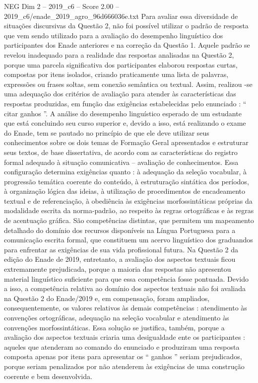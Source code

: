 \begin{textsample}{NEG Dim 2 – 2019\_c6 – Score 2.00 – 2019\_c6/enade\_2019\_agro\_96d666036e.txt}
Para avaliar essa diversidade de situações discursivas da Questão 2, não foi possível utilizar o padrão de resposta que vem sendo utilizado para a avaliação do desempenho linguístico dos participantes dos Enade anteriores e na correção da Questão 1.
Aquele padrão se revelou inadequado para a realidade das respostas analisadas na Questão 2, porque uma parcela significativa dos participantes elaborou respostas curtas, compostas por itens isolados, criando praticamente uma lista de palavras, expressões ou frases soltas, sem conexão semântica ou textual.
Assim, realizou -se uma adequação dos critérios de avaliação para atender às características das respostas produzidas, em função das exigências estabelecidas pelo enunciado : “ citar ganhos ”.
A análise do desempenho linguístico esperado de um estudante que está concluindo seu curso superior e, devido a isso, está realizando o exame do Enade, tem se pautado no princípio de que ele deve utilizar seus conhecimentos sobre os dois temas de Formação Geral apresentados e estruturar seus textos, de base dissertativa, de acordo com as características do registro formal adequado à situação comunicativa – avaliação de conhecimentos.
Essa configuração determina exigências quanto : à adequação da seleção vocabular, à progressão temática coerente do conteúdo, à estruturação sintática dos períodos, à organização lógica das ideias, à utilização de procedimentos de encadeamento textual e de referenciação, à obediência às exigências morfossintáticas próprias da modalidade escrita da norma-padrão, ao respeito às regras ortográficas e às regras de acentuação gráfica.
São competências distintas, que permitem um mapeamento detalhado do domínio dos recursos disponíveis na Língua Portuguesa para a comunicação escrita formal, que constituem um acervo linguístico dos graduandos para enfrentar as exigências de sua vida profissional futura.
Na Questão 2 da edição do Enade de 2019, entretanto, a avaliação dos aspectos textuais ficou extremamente prejudicada, porque a maioria das respostas não apresentou material linguístico suficiente para que essa competência fosse pontuada.
Devido a isso, a competência relativa ao domínio dos aspectos textuais não foi avaliada na Questão 2 do Enade/2019 e, em compensação, foram ampliados, consequentemente, os valores relativos às demais competências : atendimento às convenções ortográficas, adequação na seleção vocabular e atendimento às convenções morfossintáticas.
Essa solução se justifica, também, porque a avaliação dos aspectos textuais criaria uma desigualdade ente os participantes : aqueles que atenderam ao comando do enunciado e produziram uma resposta composta apenas por itens para apresentar os “ ganhos ” seriam prejudicados, porque seriam penalizados por não atenderem às exigências de uma construção coerente e bem desenvolvida.

\end{textsample}
